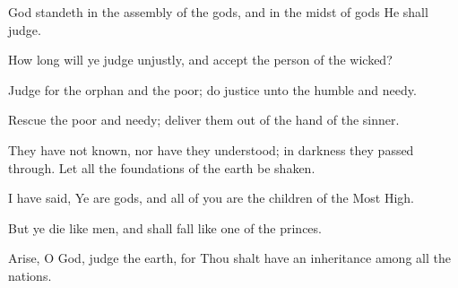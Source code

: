 God standeth in the assembly of the gods, and in the midst of gods He shall judge.

How long will ye judge unjustly, and accept the person of the wicked?

Judge for the orphan and the poor; do justice unto the humble and needy.

Rescue the poor and needy; deliver them out of the hand of the sinner.

They have not known, nor have they understood; in darkness they passed through. Let all the foundations of the earth be shaken.

I have said, Ye are gods, and all of you are the children of the Most High.

But ye die like men, and shall fall like one of the princes.

Arise, O God, judge the earth, for Thou shalt have an inheritance among all the nations.
